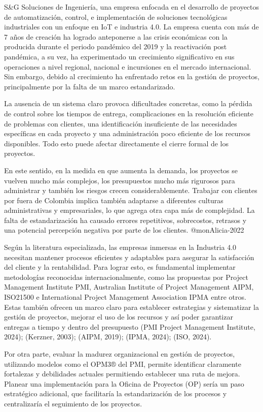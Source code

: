S\&G Soluciones de Ingeniería, una empresa enfocada en el desarrollo de proyectos de automatización, control, e implementación de soluciones tecnológicas industriales con un enfoque en IoT e industria 4.0. La empresa cuenta con más de 7 años de creación ha logrado anteponerse a las crisis económicas con la producida durante el periodo pandémico del 2019 y la reactivación post pandémica, a su vez, ha experimentado un crecimiento significativo en sus operaciones a nivel regional, nacional e incursiones en el mercado internacional. Sin embargo, debido al crecimiento ha enfrentado retos en la gestión de proyectos, principalmente por la falta de un marco estandarizado. \parencite{castrodiazPropuestaDisenoMetodologia2023}

La ausencia de un sistema claro provoca dificultades concretas, como la pérdida de control sobre los tiempos de entrega, complicaciones en la resolución eficiente de problemas con clientes, una identificación insuficiente de las necesidades específicas en cada proyecto y una administración poco eficiente de los recursos disponibles. Todo esto puede afectar directamente el cierre formal de los proyectos.

En este sentido, en la medida en que aumenta la demanda, los proyectos se vuelven mucho más complejos, los presupuestos mucho más rigurosos para administrar y también los riesgos crecen considerablemente. Trabajar con clientes por fuera de Colombia implica también adaptarse a diferentes culturas administrativas y empresariales, lo que agrega otra capa más de complejidad. La falta de estandarización ha causado errores repetitivos, sobrecostos, retrasos y una potencial percepción negativa por parte de los clientes. @monAlicia-2022

Según la literatura especializada, las empresas inmersas en la Industria 4.0 necesitan mantener procesos eficientes y adaptables para asegurar la satisfacción del cliente y la rentabilidad. Para lograr esto, es fundamental implementar metodologías reconocidas internacionalmente, como las propuestas por Project Management Institute PMI, Australian Institute of Project Management AIPM, ISO21500 e International Project Management Association IPMA entre otros. Estas también ofrecen un marco claro para establecer estrategias y sistematizar la gestión de proyectos, mejorar el uso de los recursos y así poder garantizar entregas a tiempo y dentro del presupuesto (PMI Project Management Institute, 2024); (Kerzner, 2003); (AIPM, 2019); (IPMA, 2024); (ISO, 2024).

Por otra parte, evaluar la madurez organizacional en gestión de proyectos, utilizando modelos como el OPM3® del PMI, permite identificar claramente fortalezas y debilidades actuales permitiendo establecer una ruta de mejora. Planear una implementación para la Oficina de Proyectos (OP) sería un paso estratégico adicional, que facilitaría la estandarización de los procesos y centralizaría el seguimiento de los proyectos.

